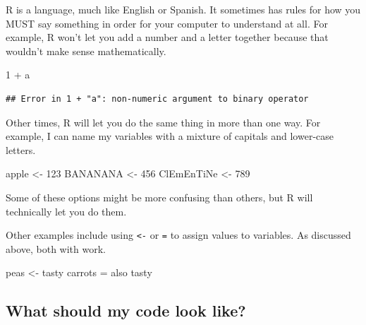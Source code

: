 \documentclass[
]{book}
\newenvironment{Shaded}{\begin{snugshade}}{\end{snugshade}}
\newcommand{\DecValTok}[1]{\textcolor[rgb]{0.00,0.00,0.81}{#1}}
\newcommand{\NormalTok}[1]{#1}
\newcommand{\OtherTok}[1]{\textcolor[rgb]{0.56,0.35,0.01}{#1}}
\newcommand{\SpecialCharTok}[1]{\textcolor[rgb]{0.00,0.00,0.00}{#1}}
\newcommand{\StringTok}[1]{\textcolor[rgb]{0.31,0.60,0.02}{#1}}
\begin{document}
R is a language, much like English or Spanish. It sometimes has rules for how you MUST say something in order for your computer to understand at all. For example, R won't let you add a number and a letter together because that wouldn't make sense mathematically.

\begin{Shaded}
\begin{Highlighting}[]
\DecValTok{1} \SpecialCharTok{+} \StringTok{\textquotesingle{}a\textquotesingle{}}
\end{Highlighting}
\end{Shaded}

\begin{verbatim}
## Error in 1 + "a": non-numeric argument to binary operator
\end{verbatim}

Other times, R will let you do the same thing in more than one way. For example, I can name my variables with a mixture of capitals and lower-case letters.

\begin{Shaded}
\begin{Highlighting}[]
\NormalTok{apple }\OtherTok{\textless{}{-}} \DecValTok{123}
\NormalTok{BANANANA }\OtherTok{\textless{}{-}} \DecValTok{456}
\NormalTok{ClEmEnTiNe }\OtherTok{\textless{}{-}} \DecValTok{789}
\end{Highlighting}
\end{Shaded}

Some of these options might be more confusing than others, but R will technically let you do them.

Other examples include using \texttt{\textless{}-} or \texttt{=} to assign values to variables. As discussed above, both with work.

\begin{Shaded}
\begin{Highlighting}[]
\NormalTok{peas }\OtherTok{\textless{}{-}} \StringTok{\textquotesingle{}tasty\textquotesingle{}}
\NormalTok{carrots }\OtherTok{=} \StringTok{\textquotesingle{}also tasty\textquotesingle{}}
\end{Highlighting}
\end{Shaded}

\hypertarget{what-should-my-code-look-like}{%
\subsection{What should my code look like?}\label{what-should-my-code-look-like}}
\end{document}
